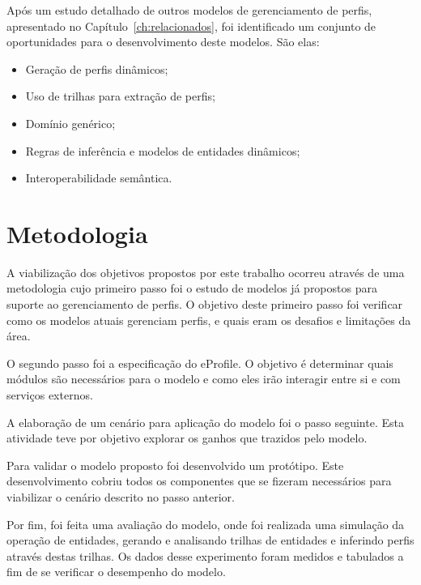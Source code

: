 Após um estudo detalhado de outros modelos de gerenciamento de perfis, apresentado no Capítulo~\ref{ch:relacionados}, foi identificado um conjunto de oportunidades para o desenvolvimento deste modelos. São elas:

\begin{itemize}
  \item Geração de perfis dinâmicos;
  \item Uso de trilhas para extração de perfis;
  \item Domínio genérico;
  \item Regras de inferência e modelos de entidades dinâmicos;
  \item Interoperabilidade semântica.
\end{itemize}


\section{Metodologia}
\label{sec:metodologia}

A viabilização dos objetivos propostos por este trabalho ocorreu através de uma metodologia cujo primeiro passo foi o estudo de modelos já propostos para suporte ao gerenciamento de perfis. O objetivo deste primeiro passo foi verificar como os modelos atuais gerenciam perfis, e quais eram os desafios e limitações da área.

O segundo passo foi a especificação do eProfile. O objetivo é determinar quais módulos são necessários para o modelo e como eles irão interagir entre si e com serviços externos.

A elaboração de um cenário para aplicação do modelo foi o passo seguinte. Esta atividade teve por objetivo explorar os ganhos que trazidos pelo modelo.

Para validar o modelo proposto foi desenvolvido um protótipo. Este desenvolvimento cobriu todos os componentes que se fizeram necessários para viabilizar o cenário descrito no passo anterior.

Por fim, foi feita uma avaliação do modelo, onde foi realizada uma simulação da operação de entidades, gerando e analisando trilhas de entidades e inferindo perfis através destas trilhas. Os dados desse experimento foram medidos e tabulados a fim de se verificar o desempenho do modelo.


